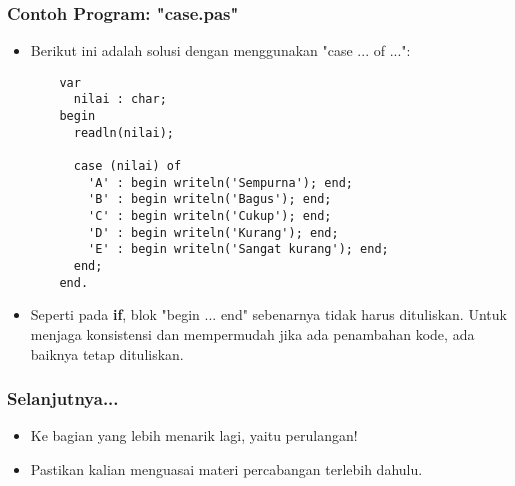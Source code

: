 \documentclass{beamer}
\begin{document}
\begin{frame}[fragile]
\frametitle{Contoh Program: "case.pas"}
\begin{itemize}
  \item Berikut ini adalah solusi dengan menggunakan "case ... of ...":
  \begin{lstlisting}
    var
      nilai : char;
    begin
      readln(nilai);

      case (nilai) of
        'A' : begin writeln('Sempurna'); end;
        'B' : begin writeln('Bagus'); end;
        'C' : begin writeln('Cukup'); end;
        'D' : begin writeln('Kurang'); end;
        'E' : begin writeln('Sangat kurang'); end;
      end;
    end.
  \end{lstlisting}
  \item Seperti pada \textbf{if}, blok "begin ... end" sebenarnya tidak harus dituliskan. Untuk menjaga konsistensi dan mempermudah \newline jika ada penambahan kode, ada baiknya tetap dituliskan.
\end{itemize}
\end{frame}

\begin{frame}
\frametitle{Selanjutnya...}
\begin{itemize}
  \item Ke bagian yang lebih menarik lagi, yaitu perulangan!
  \item Pastikan kalian menguasai materi percabangan terlebih dahulu.
\end{itemize}
\end{frame}
\end{document}
